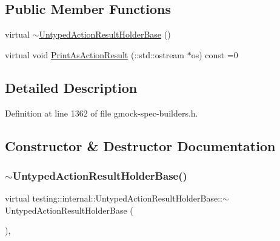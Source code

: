 \subsection*{Public Member Functions}
\begin{DoxyCompactItemize}
\item 
virtual \hyperlink{classtesting_1_1internal_1_1UntypedActionResultHolderBase_a2e6c331d249aea75ccc1e4fba3897a29}{$\sim$\+Untyped\+Action\+Result\+Holder\+Base} ()
\item 
virtual void \hyperlink{classtesting_1_1internal_1_1UntypedActionResultHolderBase_a4b4a558fcb1d3b02c0fec34f186d3b90}{Print\+As\+Action\+Result} (\+::std\+::ostream $\ast$os) const =0
\end{DoxyCompactItemize}


\subsection{Detailed Description}


Definition at line 1362 of file gmock-\/spec-\/builders.\+h.



\subsection{Constructor \& Destructor Documentation}
\mbox{\label{classtesting_1_1internal_1_1UntypedActionResultHolderBase_a2e6c331d249aea75ccc1e4fba3897a29}} 
\subsubsection{\texorpdfstring{$\sim$\+Untyped\+Action\+Result\+Holder\+Base()}{~UntypedActionResultHolderBase()}}
{\footnotesize\ttfamily virtual testing\+::internal\+::\+Untyped\+Action\+Result\+Holder\+Base\+::$\sim$\+Untyped\+Action\+Result\+Holder\+Base (\begin{DoxyParamCaption}{ }\end{DoxyParamCaption})\hspace{0.3cm}{\ttfamily [inline]}, {\ttfamily [virtual]}}



